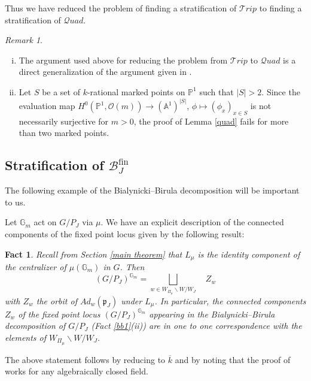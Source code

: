 \documentclass{amsart}
\newcommand{\cE}{\mathcal{E}}
\newcommand{\cQuad}{\mathcal{Q}uad}
\theoremstyle{plain}
\newtheorem{fact}{Fact}[section]
\theoremstyle{definition}
\theoremstyle{remark}
\newtheorem{remark}{Remark}[section]
\DeclareMathOperator{\rk}{rk}
\DeclareMathOperator{\fin}{fin}
\begin{document}
Thus we have reduced the problem of finding a stratification of $\mathcal{T}rip$ to finding a stratification of $\cQuad$.
\begin{remark}\label{twopointsonto}
\begin{enumerate}[(i)]
    \item The argument used above for reducing the problem from $\mathcal{T}rip$ to $\cQuad$ is a direct generalization of the argument given in \cite[Section 5.4]{Mel}.
    \item Let $S$ be a set of $k$-rational marked points on $\mathbb{P}^1$ such that $|S|>2$. Since the evaluation map $H^{0}(\mathbb{P}^{1},\mathcal{O}(m))\rightarrow(\mathbb{A}^{1})^{|S|}$, $\phi\mapsto(\phi_{x})_{x\in S}$ is not necessarily surjective for $m>0$, the proof of Lemma \ref{quad} fails for more than two marked points. 
\end{enumerate}
\end{remark}
\subsection{Stratification of $\mathcal{B}_{J}^{\fin}$} \label{stratification of bjfin}
The following example of the Bialynicki--Birula decomposition will be important to us. 

Let $\mathbb{G}_{m}$ act on $G/P_{J}$ via $\mu$. 
We have an explicit description of the connected components of the fixed point locus given by the following result:

\begin{fact}\label{b2}
Recall from Section \ref{main theorem} that $L_{\mu}$ is the identity component of the centralizer of $\mu(\mathbb{G}_{m})$ in $G$.
Then
\[
(G/P_{J})^{\mathbb{G}_{m}}=\displaystyle\bigsqcup_{w\in W_{\Pi_{\mu}}\backslash W/W_{J}}\quad Z_{w}
\]
with $Z_{w}$ the orbit of $Ad_{w}(\mathfrak{p}_{J})$ under $L_{\mu}$. In particular, the connected components $Z_{w}$ of the fixed point locus $(G/P_{J})^{\mathbb{G}_{m}}$ appearing in the Bialynicki--Birula decomposition of $G/P_{J}$ (Fact \ref{bb1}(ii)) are in one to one correspondence with the elements of $W_{\Pi_{\mu}}\backslash W/W_{J}$.
\end{fact}
\par
The above statement follows by reducing to $\overline{k}$ and by noting that the proof of \cite[Lemma 1]{Fre} works for any algebraically closed field.
\end{document}

